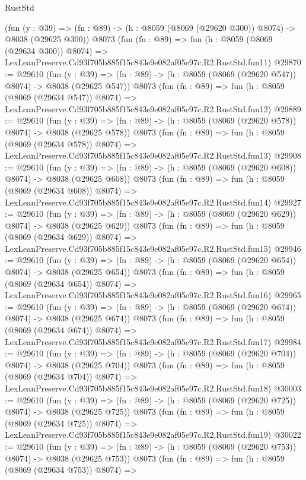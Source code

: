 \begin{lexlean}{RustStd}
\begin{coremodule}
    (fun (y : @39) => (fn : @89) -> (h : @8059 (@8069 (@29620 @300)) @8074) -> @8038 (@29625 @300))
    @8073
    (fun (fn : @89) =>
    fun (h : @8059 (@8069 (@29634 @300)) @8074) =>
    LexLeanPreserve.Cd93f705b885f15c843e9e082af05e97c.R2.RustStd.fun11)
@29870 := @29610
    (fun (y : @39) => (fn : @89) -> (h : @8059 (@8069 (@29620 @547)) @8074) -> @8038 (@29625 @547))
    @8073
    (fun (fn : @89) =>
    fun (h : @8059 (@8069 (@29634 @547)) @8074) =>
    LexLeanPreserve.Cd93f705b885f15c843e9e082af05e97c.R2.RustStd.fun12)
@29889 := @29610
    (fun (y : @39) => (fn : @89) -> (h : @8059 (@8069 (@29620 @578)) @8074) -> @8038 (@29625 @578))
    @8073
    (fun (fn : @89) =>
    fun (h : @8059 (@8069 (@29634 @578)) @8074) =>
    LexLeanPreserve.Cd93f705b885f15c843e9e082af05e97c.R2.RustStd.fun13)
@29908 := @29610
    (fun (y : @39) => (fn : @89) -> (h : @8059 (@8069 (@29620 @608)) @8074) -> @8038 (@29625 @608))
    @8073
    (fun (fn : @89) =>
    fun (h : @8059 (@8069 (@29634 @608)) @8074) =>
    LexLeanPreserve.Cd93f705b885f15c843e9e082af05e97c.R2.RustStd.fun14)
@29927 := @29610
    (fun (y : @39) => (fn : @89) -> (h : @8059 (@8069 (@29620 @629)) @8074) -> @8038 (@29625 @629))
    @8073
    (fun (fn : @89) =>
    fun (h : @8059 (@8069 (@29634 @629)) @8074) =>
    LexLeanPreserve.Cd93f705b885f15c843e9e082af05e97c.R2.RustStd.fun15)
@29946 := @29610
    (fun (y : @39) => (fn : @89) -> (h : @8059 (@8069 (@29620 @654)) @8074) -> @8038 (@29625 @654))
    @8073
    (fun (fn : @89) =>
    fun (h : @8059 (@8069 (@29634 @654)) @8074) =>
    LexLeanPreserve.Cd93f705b885f15c843e9e082af05e97c.R2.RustStd.fun16)
@29965 := @29610
    (fun (y : @39) => (fn : @89) -> (h : @8059 (@8069 (@29620 @674)) @8074) -> @8038 (@29625 @674))
    @8073
    (fun (fn : @89) =>
    fun (h : @8059 (@8069 (@29634 @674)) @8074) =>
    LexLeanPreserve.Cd93f705b885f15c843e9e082af05e97c.R2.RustStd.fun17)
@29984 := @29610
    (fun (y : @39) => (fn : @89) -> (h : @8059 (@8069 (@29620 @704)) @8074) -> @8038 (@29625 @704))
    @8073
    (fun (fn : @89) =>
    fun (h : @8059 (@8069 (@29634 @704)) @8074) =>
    LexLeanPreserve.Cd93f705b885f15c843e9e082af05e97c.R2.RustStd.fun18)
@30003 := @29610
    (fun (y : @39) => (fn : @89) -> (h : @8059 (@8069 (@29620 @725)) @8074) -> @8038 (@29625 @725))
    @8073
    (fun (fn : @89) =>
    fun (h : @8059 (@8069 (@29634 @725)) @8074) =>
    LexLeanPreserve.Cd93f705b885f15c843e9e082af05e97c.R2.RustStd.fun19)
@30022 := @29610
    (fun (y : @39) => (fn : @89) -> (h : @8059 (@8069 (@29620 @753)) @8074) -> @8038 (@29625 @753))
    @8073
    (fun (fn : @89) =>
    fun (h : @8059 (@8069 (@29634 @753)) @8074) =>

\end{coremodule}
\end{lexlean}
